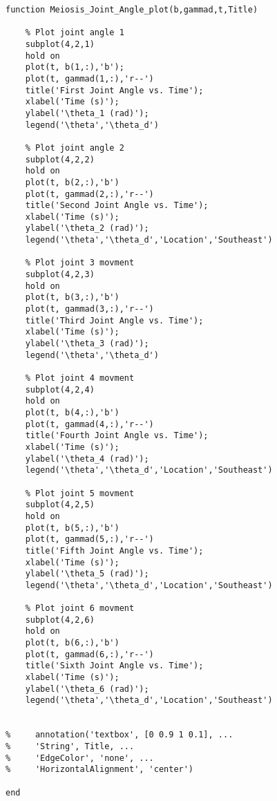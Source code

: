 \begin{lstlisting}[frame=lines,style=Matlab-editor,basicstyle = \mlttfamily, caption=Joint Angle Plotting Code]
function Meiosis_Joint_Angle_plot(b,gammad,t,Title)

    % Plot joint angle 1
    subplot(4,2,1)
    hold on
    plot(t, b(1,:),'b');
    plot(t, gammad(1,:),'r--')
    title('First Joint Angle vs. Time');
    xlabel('Time (s)');
    ylabel('\theta_1 (rad)');
    legend('\theta','\theta_d')

    % Plot joint angle 2
    subplot(4,2,2)
    hold on
    plot(t, b(2,:),'b')
    plot(t, gammad(2,:),'r--')
    title('Second Joint Angle vs. Time');
    xlabel('Time (s)');
    ylabel('\theta_2 (rad)');
    legend('\theta','\theta_d','Location','Southeast')

    % Plot joint 3 movment
    subplot(4,2,3)
    hold on
    plot(t, b(3,:),'b')
    plot(t, gammad(3,:),'r--')
    title('Third Joint Angle vs. Time');
    xlabel('Time (s)');
    ylabel('\theta_3 (rad)');
    legend('\theta','\theta_d')

    % Plot joint 4 movment
    subplot(4,2,4)
    hold on
    plot(t, b(4,:),'b')
    plot(t, gammad(4,:),'r--')
    title('Fourth Joint Angle vs. Time');
    xlabel('Time (s)');
    ylabel('\theta_4 (rad)');
    legend('\theta','\theta_d','Location','Southeast')

    % Plot joint 5 movment
    subplot(4,2,5)
    hold on
    plot(t, b(5,:),'b')
    plot(t, gammad(5,:),'r--')
    title('Fifth Joint Angle vs. Time');
    xlabel('Time (s)');
    ylabel('\theta_5 (rad)');
    legend('\theta','\theta_d','Location','Southeast')

    % Plot joint 6 movment
    subplot(4,2,6)
    hold on
    plot(t, b(6,:),'b')
    plot(t, gammad(6,:),'r--')
    title('Sixth Joint Angle vs. Time');
    xlabel('Time (s)');
    ylabel('\theta_6 (rad)');
    legend('\theta','\theta_d','Location','Southeast')


%     annotation('textbox', [0 0.9 1 0.1], ...
%     'String', Title, ...
%     'EdgeColor', 'none', ...
%     'HorizontalAlignment', 'center')

end
\end{lstlisting}
